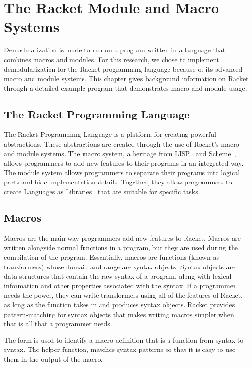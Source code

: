 \chapter{The Racket Module and Macro Systems}
\label{chap:module-system}

Demodularization is made to run on a program written in a language that combines macros and modules.
For this research, we chose to implement demodularization for the Racket programming language because of its advanced macro and module systems.
This chapter gives background information on Racket through a detailed example program that demonstrates macro and module usage.

\section{The Racket Programming Language}
The Racket Programming Language is a platform for creating powerful abstractions.
These abstractions are created through the use of Racket's macro and module systems. 
The macro system, a heritage from LISP~\cite{LISP} and Scheme~\cite{scheme}, allows programmers to add new features to their programs in an integrated way.
The module system allows programmers to separate their programs into logical parts and hide implementation details. 
Together, they allow programmers to create Languages as Libraries~\cite{lal} that are suitable for specific tasks.

\section{Macros}
Macros are the main way programmers add new features to Racket. 
Macros are written alongside normal functions in a program, but they are used during the compilation of the program. 
Essentially, macros are functions (known as transformers) whose domain and range are syntax objects.
Syntax objects are data structures that contain the raw syntax of a program, along with lexical information and other properties associated with the syntax.
If a programmer needs the power, they can write transformers using all of the features of Racket, as long as the function takes in and produces syntax objects.
Racket provides pattern-matching for syntax objects that makes writing macros simpler when that is all that a programmer needs.

The  form is used to identify a macro definition that is a function from syntax to syntax.
The helper function,  matches syntax patterns so that it is easy to use them in the output of the macro.


